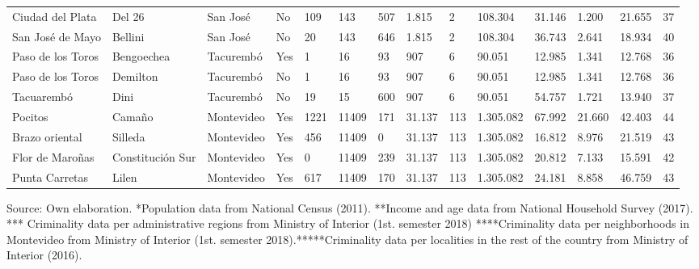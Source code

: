 \documentclass[11pt]{article}
\begin{document}
\begin{landscape}
\begin{longtable}[htbp]{@{}p{1.2cm}p{1cm}p{1.5cm}p{1cm}p{1cm}p{1cm}p{1cm}p{1cm}p{1cm}p{1cm}p{1cm}p{1.2cm}p{1cm}p{1cm}@{}}
Ciudad del Plata	&	Del 26	&	San José	&	No	&	109	&	143	&	507	&	1.815	&	2	&	108.304	&	31.146	&	1.200	&	21.655	&	37	\tabularnewline
San José de Mayo	&	Bellini	&	San José	&	No	&	20	&	143	&	646	&	1.815	&	2	&	108.304	&	36.743	&	2.641	&	18.934	&	40	\tabularnewline
Paso de los Toros	&	Bengoechea	&	Tacurembó	&	Yes	&	1	&	16	&	93	&	907	&	6	&	90.051	&	12.985	&	1.341	&	12.768	&	36	\tabularnewline
Paso de los Toros	&	Demilton	&	Tacurembó	&	No	&	1	&	16	&	93	&	907	&	6	&	90.051	&	12.985	&	1.341	&	12.768	&	36	\tabularnewline
Tacuarembó	&	Dini	&	Tacurembó	&	No	&	19	&	15	&	600	&	907	&	6	&	90.051	&	54.757	&	1.721	&	13.940	&	37	\tabularnewline
Pocitos	&	Camaño	&	Montevideo	&	Yes	&	1221	&	11409	&	171	&	31.137	&	113	&	1.305.082	&	67.992	&	21.660	&	42.403	&	44	\tabularnewline
Brazo oriental	&	Silleda	&	Montevideo	&	Yes	&	456	&	11409	&	0	&	31.137	&	113	&	1.305.082	&	16.812	&	8.976	&	21.519	&	43	\tabularnewline
Flor de Maroñas	&	Constitución Sur	&	Montevideo	&	Yes	&	0	&	11409	&	239	&	31.137	&	113	&	1.305.082	&	20.812	&	7.133	&	15.591	&	42	\tabularnewline
Punta Carretas	&	Lilen	&	Montevideo	&	Yes	&	617	&	11409	&	170	&	31.137	&	113	&	1.305.082	&	24.181	&	8.858	&	46.759	&	43	\tabularnewline

\bottomrule
\end{longtable}

Source: Own elaboration. *Population data from National Census (2011). **Income and age data from National Household Survey (2017). *** Criminality data per administrative regions from Ministry of Interior (1st. semester 2018) ****Criminality data per neighborhoods in Montevideo from Ministry of Interior (1st. semester 2018).*****Criminality data per localities in the rest of the country from Ministry of Interior (2016).
\end{landscape}
\restoregeometry
\end{document}
